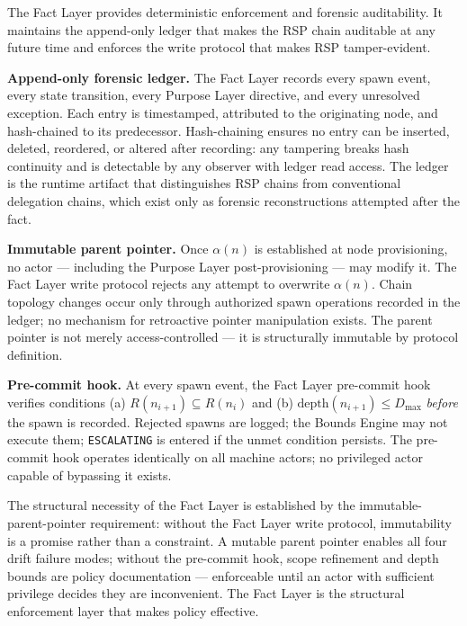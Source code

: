 The Fact Layer provides deterministic enforcement and forensic auditability. It maintains the append-only ledger that makes the RSP chain auditable at any future time and enforces the write protocol that makes RSP tamper-evident.

\medskip
\noindent\textbf{Append-only forensic ledger.} The Fact Layer records every spawn event, every state transition, every Purpose Layer directive, and every unresolved exception. Each entry is timestamped, attributed to the originating node, and hash-chained to its predecessor. Hash-chaining ensures no entry can be inserted, deleted, reordered, or altered after recording: any tampering breaks hash continuity and is detectable by any observer with ledger read access. The ledger is the runtime artifact that distinguishes RSP chains from conventional delegation chains, which exist only as forensic reconstructions attempted after the fact.

\medskip
\noindent\textbf{Immutable parent pointer.} Once $\alpha(n)$ is established at node provisioning, no actor — including the Purpose Layer post-provisioning — may modify it. The Fact Layer write protocol rejects any attempt to overwrite $\alpha(n)$. Chain topology changes occur only through authorized spawn operations recorded in the ledger; no mechanism for retroactive pointer manipulation exists. The parent pointer is not merely access-controlled — it is structurally immutable by protocol definition.

\medskip
\noindent\textbf{Pre-commit hook.} At every spawn event, the Fact Layer pre-commit hook verifies conditions (a) $R(n_{i+1}) \subseteq R(n_i)$ and (b) $\mathrm{depth}(n_{i+1}) \leq D_{\mathrm{max}}$ \emph{before} the spawn is recorded. Rejected spawns are logged; the Bounds Engine may not execute them; \texttt{ESCALATING} is entered if the unmet condition persists. The pre-commit hook operates identically on all machine actors; no privileged actor capable of bypassing it exists.

The structural necessity of the Fact Layer is established by the immutable-parent-pointer requirement: without the Fact Layer write protocol, immutability is a promise rather than a constraint. A mutable parent pointer enables all four drift failure modes; without the pre-commit hook, scope refinement and depth bounds are policy documentation — enforceable until an actor with sufficient privilege decides they are inconvenient. The Fact Layer is the structural enforcement layer that makes policy effective.

